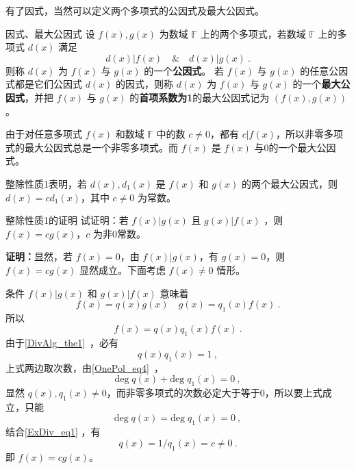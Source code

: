 有了因式，当然可以定义两个多项式的公因式及最大公因式。
\begin{definition}{因式、最大公因式}\label{ExDiv_def2}
设 $f(x),g(x)$ 为数域 $\mathbb{F}$ 上的两个多项式，若数域 $\mathbb{F}$ 上的多项式 $d(x)$ 满足
\begin{equation}
d(x)|f(x)\quad\&\quad d(x)|g(x)~.
\end{equation}
则称 $d(x)$ 为 $f(x)$ 与 $g(x)$ 的一个\textbf{公因式}。
若 $f(x)$ 与 $g(x)$ 的任意公因式都是它们公因式 $d(x)$ 的因式，则称 $d(x)$ 为 $f(x)$ 与 $g(x)$ 的一个\textbf{最大公因式}，并把 $f(x)$ 与 $g(x)$ 的\textbf{首项系数为1}的最大公因式记为 $(f(x),g(x))$。
\end{definition}

由于对任意多项式 $f(x)$ 和数域 $\mathbb{F}$ 中的数 $c\neq 0$，都有 $c|f(x)$，所以非零多项式的最大公因式总是一个非零多项式。而 $f(x)$ 是 $f(x)$ 与0的一个最大公因式。

整除性质1表明，若 $d(x),d_1(x)$ 是 $f(x)$ 和 $g(x)$ 的两个最大公因式，则 $d(x)=cd_1(x)$，其中 $c\neq 0$ 为常数。
\begin{example}{整除性质1的证明}\label{ExDiv_ex1}
试证明：若 $f(x)|g(x)$ 且 $g(x)|f(x)$ ，则 $f(x)=cg(x)$，$c$ 为非0常数。

\textbf{证明：}显然，若 $f(x)=0$，由 $f(x)|g(x)$，有 $g(x)=0$，则 $f(x)=cg(x)$ 显然成立。下面考虑 $f(x)\neq 0$ 情形。

条件 $f(x)|g(x)$ 和 $g(x)|f(x)$ 意味着
\begin{equation}
f(x)=q(x)g(x)\quad g(x)=q_1(x)f(x)~.
\end{equation}
所以
\begin{equation}
f(x)=q(x)q_1(x)f(x)~.
\end{equation}
由于\autoref{DivAlg_the1}~，必有
\begin{equation}\label{ExDiv_eq1}
q(x)q_1(x)=1~,
\end{equation}
上式两边取次数，由\autoref{OnePol_eq4}~，
\begin{equation}
\mathrm{deg}\;q(x)+\mathrm{deg}\;q_1(x)=0~,
\end{equation}
显然 $q(x),q_1(x)\neq 0$，而非零多项式的次数必定大于等于0，所以要上式成立，只能
\begin{equation}
\mathrm{deg}\;q(x)=\mathrm{deg}\;q_1(x)=0~,
\end{equation}
结合\autoref{ExDiv_eq1} ，有
 \begin{equation}
 q(x)=1/q_1(x)=c\neq 0~.
 \end{equation}
 即 $f(x)=cg(x)$。

\end{example}

